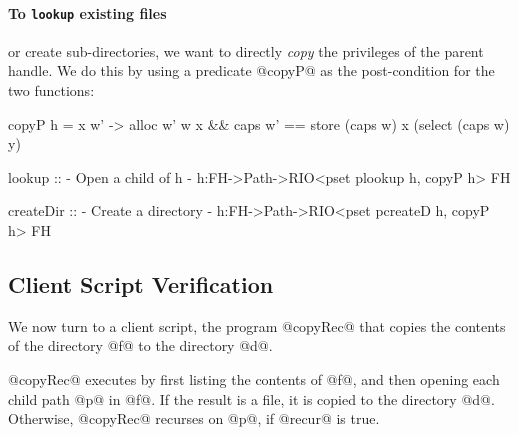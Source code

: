 \paragraph{To \texttt{lookup} existing files} or create sub-directories,
we want to directly \emph{copy} the privileges of the parent handle. 
We do this by using a predicate @copyP@ as the post-condition for 
the two functions:
%
\begin{code}
  copyP h = \w x w' ->
    alloc w' w x && 
    caps w' == store (caps w) x 
                     (select (caps w) y)

  lookup :: {- Open a child of h -}
    h:FH->Path->RIO<pset plookup h, copyP h> FH

  createDir :: {- Create a directory -}
    h:FH->Path->RIO<pset pcreateD h, copyP h> FH
\end{code}
  
\subsection{Client Script Verification}
\label{sec:fs-client}
%
We now turn to a client script,
the program @copyRec@ %
that copies the contents of the directory @f@ to the
directory @d@.
%
%
@copyRec@ executes by first listing the contents of @f@, 
and then opening each child path @p@ in @f@. 
%
If the result is a file, it is copied to the directory @d@.
%
Otherwise, @copyRec@ recurses on @p@, if @recur@ is true.

